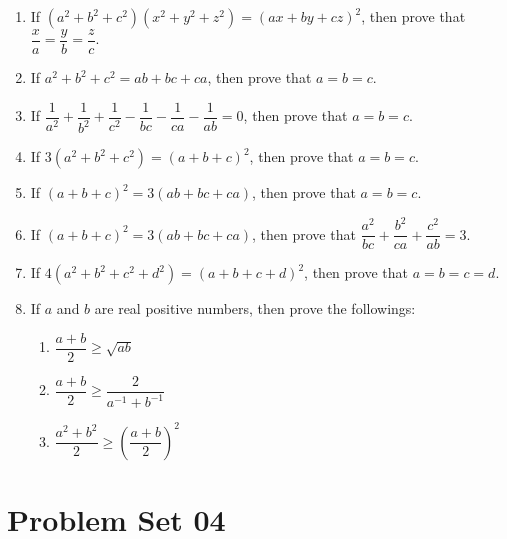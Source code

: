 \begin{enumerate}
			\item If $(a^2+b^2+c^2)(x^2+y^2+z^2)=(ax+by+cz)^2$, then prove that $\dfrac{x}{a}=\dfrac{y}{b}=\dfrac{z}{c}$.
			\item If $a^2+b^2+c^2=ab+bc+ca$, then prove that $a=b=c$.
			\item If $\dfrac{1}{a^2}+\dfrac{1}{b^2}+\dfrac{1}{c^2}-\dfrac{1}{bc}-\dfrac{1}{ca}-\dfrac{1}{ab}=0$, then prove that $a=b=c$.
			\item If $3(a^2+b^2+c^2)=(a+b+c)^2$, then prove that $a=b=c$.
			\item If $(a+b+c)^2=3(ab+bc+ca)$, then prove that $a=b=c$.
			\item If $(a+b+c)^2=3(ab+bc+ca)$, then prove that $\dfrac{a^2}{bc}+\dfrac{b^2}{ca}+\dfrac{c^2}{ab}=3$.
			\item If $4(a^2+b^2+c^2+d^2)=(a+b+c+d)^2$, then prove that $a=b=c=d$.
		
			\item If $a$ and $b$ are real positive numbers, then prove the followings:
				\begin{enumerate}[label=(\alph*)]
					\item $\dfrac{a+b}{2}\geq \sqrt{ab}$
					\item $\dfrac{a+b}{2}\geq \dfrac{2}{a^{-1}+b^{-1}}$
					\item $\dfrac{a^2+b^2}{2}\geq \left(\dfrac{a+b}{2}\right)^2$
				\end{enumerate}  
				 
		
		
		\end{enumerate}

\newpage
\section{Problem Set 04}
